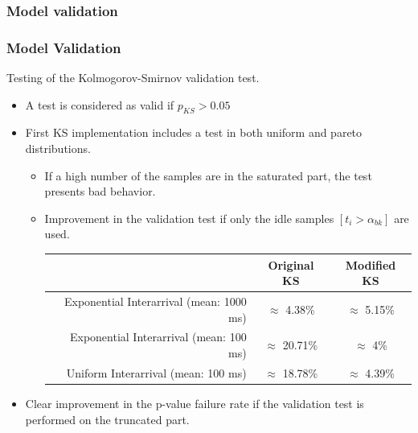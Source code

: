\documentclass[9pt,handout,serif]{beamer}
\begin{document}
\subsubsection*{Model validation}
\begin{frame}[c]
	\frametitle{Model Validation}
	Testing of the Kolmogorov-Smirnov validation test.
	\begin{itemize}
		\item A test is considered as valid if $p_{KS}>0.05$
		\item First KS implementation includes a test in both uniform and pareto distributions.
		\begin{itemize}
			\item If a high number of the samples are in the saturated part, the test presents bad behavior.
			\item Improvement in the validation test if only the idle samples $[t_i > \alpha_{bk}]$ are used.
			\begin{table}
				\centering
				\scriptsize
				\begin{tabular}{ r | c | c }
					& Original KS & Modified KS \\ \hline
					Exponential Interarrival (mean: 1000 ms) & $\approx$ 4.38\% & $\approx$ 5.15\% \\ 
		Exponential Interarrival (mean: 100 ms) & $\approx$ 20.71\% & $\approx$ 4\% \\ 
		Uniform Interarrival (mean: 100 ms) & $\approx$ 18.78\% & $\approx$ 4.39\% \\ 
				\end{tabular}
			\end{table}
		\end{itemize}
		\item Clear improvement in the p-value failure rate if the validation test is performed on the truncated part.
	\end{itemize}
\end{frame}
\end{document}
